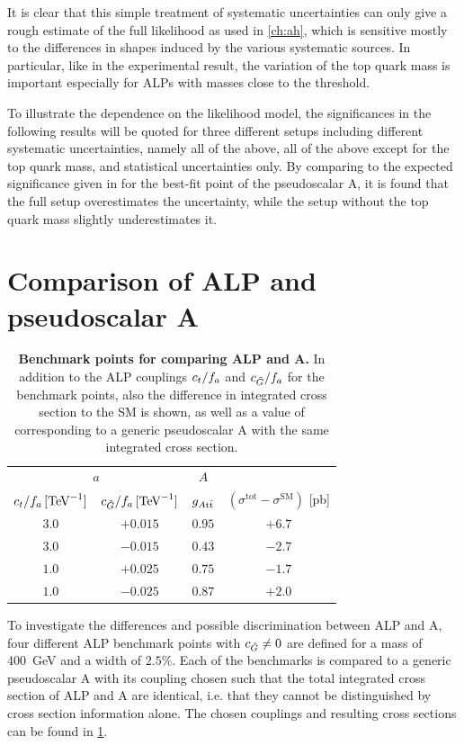 It is clear that this simple treatment of systematic uncertainties can only give a rough estimate of the full likelihood as used in \cref{ch:ah}, which is sensitive mostly to the differences in shapes induced by the various systematic sources.
In particular, like in the experimental result, the variation of the top quark mass is important especially for ALPs with masses close to the \ttbar threshold.

To illustrate the dependence on the likelihood model, the significances in the following results will be quoted for three different setups including different systematic uncertainties, namely all of the above, all of the above except for the top quark mass, and statistical uncertainties only. By comparing to the expected significance given in  for the best-fit point of the pseudoscalar A, it is found that the full setup overestimates the uncertainty, while the setup without the top quark mass slightly underestimates it. 

\section{Comparison of ALP and pseudoscalar A}
\label{sec:alps:ALPvsA}

\begin{table}
\centering
\begin{tabular}{cc |c | c}
\multicolumn{2}{c}{$a$} & $A$ \\
$c_t/f_a \,  [\text{TeV}^{-1}]$ & $c_{\tilde{G}}/f_a \,  [\text{TeV}^{-1}]$ & $g_{A\mathrm{t \bar{t}}}$ & $(\sigma^\text{tot}-\sigma^\text{SM})$ [pb] \\
\hline
\hline
$3.0$ & $+0.015$ & $0.95$ & $+6.7$ \\
$3.0$ & $-0.015$ & $0.43$ & $-2.7$ \\
$1.0$ & $+0.025$ & $0.75$ & $-1.7$ \\
$1.0$ & $-0.025$ & $0.87$ & $+2.0$ \\
\end{tabular}
\caption{\textbf{Benchmark points for comparing ALP and A.} In addition to the ALP couplings $c_t/f_a$ and $c_{\tilde{G}}/f_a$ for the benchmark points, also the difference in integrated cross section to the SM is shown, as well as a value of \gAtt corresponding to a generic pseudoscalar A with the same integrated cross section.}
\label{tab:alps:benchmarks}
\end{table}

To investigate the differences and possible discrimination between ALP and A, four different ALP benchmark points with $c_{\tilde{G}} \neq 0$ are defined for a mass of \SI{400}{\GeV} and a width of $2.5\%$. Each of the benchmarks is compared to a generic pseudoscalar A with its coupling \gAtt chosen such that the total integrated cross section of ALP and A are identical, i.e. that they cannot be distinguished by cross section information alone. The chosen couplings and resulting cross sections can be found in \cref{tab:alps:benchmarks}.

